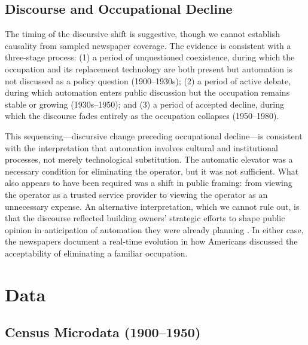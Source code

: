 \documentclass[12pt]{article}
\begin{document}
\subsection{Discourse and Occupational Decline}

The timing of the discursive shift is suggestive, though we cannot establish causality from sampled newspaper coverage. The evidence is consistent with a three-stage process: (1) a period of unquestioned coexistence, during which the occupation and its replacement technology are both present but automation is not discussed as a policy question (1900--1930s); (2) a period of active debate, during which automation enters public discussion but the occupation remains stable or growing (1930s--1950); and (3) a period of accepted decline, during which the discourse fades entirely as the occupation collapses (1950--1980).

This sequencing---discursive change preceding occupational decline---is consistent with the interpretation that automation involves cultural and institutional processes, not merely technological substitution. The automatic elevator was a necessary condition for eliminating the operator, but it was not sufficient. What also appears to have been required was a shift in public framing: from viewing the operator as a trusted service provider to viewing the operator as an unnecessary expense. An alternative interpretation, which we cannot rule out, is that the discourse reflected building owners' strategic efforts to shape public opinion in anticipation of automation they were already planning \citep{mokyr1992}. In either case, the newspapers document a real-time evolution in how Americans discussed the acceptability of eliminating a familiar occupation.



\section{Data} \label{sec:data}

\subsection{Census Microdata (1900--1950)}
\end{document}

